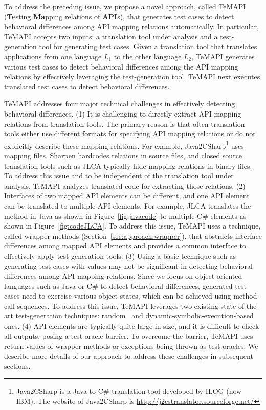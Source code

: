 To address the preceding issue, we propose a novel approach, called TeMAPI (\textbf{Te}sting \textbf{Ma}pping relations of \textbf{API}s), that generates test cases to detect behavioral differences among API mapping relations automatically. In particular, TeMAPI accepts two inputs: a translation tool under analysis and a test-generation tool for generating test cases. Given a translation tool that translates applications from one language $L_1$ to the other language $L_2$, TeMAPI generates various test cases to detect behavioral differences among the API mapping relations by effectively leveraging the test-generation tool. TeMAPI next executes translated test cases to detect behavioral differences.

TeMAPI addresses four major technical challenges in effectively detecting behavioral differences. (1) It is challenging to directly extract API mapping relations from translation tools. The primary reason is that often translation tools either use different formats for specifying API mapping relations or do not explicitly describe these mapping relations. For example, Java2CSharp\footnote{Java2CSharp is a Java-to-C\# translation tool developed by ILOG (now IBM). The website of Java2CSharp is \url{http://j2cstranslator.sourceforge.net/}} uses mapping files, Sharpen hardcodes relations in source files, and closed source translation tools such as JLCA typically hide mapping relations in binary files. To address this issue and to be independent of the translation tool under analysis, TeMAPI analyzes translated code for extracting those relations. (2) Interfaces of two mapped API elements can be different, and one API element can be translated to multiple API elements. For example, JLCA translates the  method in Java as shown in Figure~\ref{fig:javacode} to multiple C\# elements as shown in Figure~\ref{fig:codeJLCA}.
To address this issue, TeMAPI uses a technique, called wrapper methods (Section~\ref{sec:approach:wrapper}), that abstracts interface differences among mapped API elements and provides a common interface to effectively apply test-generation tools. (3) Using a basic technique such as generating test cases with  values may not be significant in detecting behavioral differences among API mapping relations. Since we focus on object-oriented languages such as Java or C\# to detect behavioral differences, generated test cases need to exercise various object states, which can be achieved using method-call sequences. To address this issue, TeMAPI leverages two existing state-of-the-art test-generation techniques: random~\citep{pacheco2007feedback} and dynamic-symbolic-execution-based~\citep{koushik:cute, godefroid:dart, tillmann2008pex} ones. (4) API elements are typically quite large in size, and it is difficult to check all outputs, posing a test oracle barrier. To overcome the barrier, TeMAPI uses return values of wrapper methods or exceptions being thrown as test oracles. We describe more details of our approach to address these challenges in subsequent sections.

